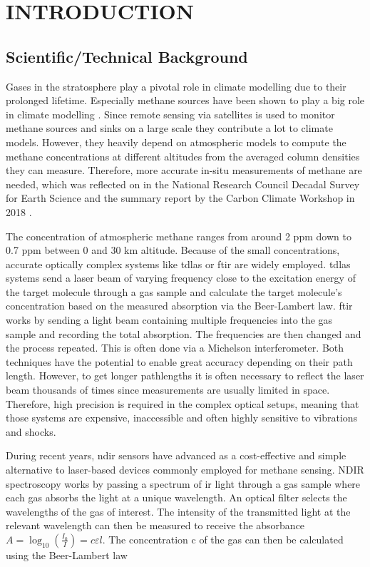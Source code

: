 \chapter{INTRODUCTION}
\label{sec:introduction}
\section{Scientific/Technical Background}

Gases in the stratosphere play a pivotal role in climate modelling due to their prolonged lifetime.
Especially methane sources have been shown to play a big role in climate modelling \cite{stocker2013, saunois2017, nisbet2019, turner2019}. Since remote sensing via satellites is used to monitor methane sources and sinks on a large scale they contribute a lot to climate models. However, they heavily depend on atmospheric models to compute the methane concentrations at different altitudes from the averaged column densities they can measure. Therefore, more accurate in-situ measurements of methane are needed, which was reflected on in the National Research Council Decadal Survey for Earth Science \cite{national2019} and the summary report by the Carbon Climate Workshop in 2018 \cite{sellers2018}. 

The concentration of atmospheric methane ranges from around 2 ppm down to 0.7 ppm between 0 and 30 km altitude.
Because of the small concentrations, accurate optically complex systems like \gls{tdlas} \cite{joly2020} or \gls{ftir} \cite{runge2023} are widely employed.
\gls{tdlas} systems send a laser beam of varying frequency close to the excitation energy of the target molecule through a gas sample and calculate the target molecule's concentration based on the measured absorption via the Beer-Lambert law.
\gls{ftir} works by sending a light beam containing multiple frequencies into the gas sample and recording the total absorption.
The frequencies are then changed and the process repeated.
This is often done via a Michelson interferometer.
Both techniques have the potential to enable great accuracy depending on their path length. However, to get longer pathlengths it is often necessary to reflect the laser beam thousands of times since measurements are usually limited in space. Therefore, high precision is required in the complex optical setups, meaning that those systems are expensive, inaccessible and often highly sensitive to vibrations and shocks.

During recent years, \gls{ndir} sensors have advanced as a cost-effective and simple alternative to laser-based devices commonly employed for methane sensing.
NDIR spectroscopy works by passing a spectrum of \gls{ir} light through a gas sample where each gas absorbs the light at a unique wavelength.
An optical filter selects the wavelengths of the gas of interest.
The intensity of the transmitted light at the relevant wavelength can then be measured to receive the absorbance $A=\log_{10}\left(\frac{I_0}{I}\right) = c\varepsilon l$.
The concentration c of the gas can then be calculated using the Beer-Lambert law

